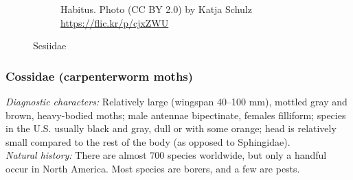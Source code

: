 \documentclass[letterpaper, 11pt]{article}
\begin{document}
\begin{figure}[ht!]
\begin{subfigure}[ht!]{0.40\textwidth}
        \caption{Habitus. Photo (CC BY 2.0) by Katja Schulz \url{https://flic.kr/p/cjxZWU}}
        \label{fig:sesiid2}
    \end{subfigure}
    \caption{Sesiidae}\label{fig:sesiids}
\end{figure}

\subsubsection{Cossidae (carpenterworm moths)}
\noindent{}\textit{Diagnostic characters:} Relatively large (wingspan 40--100 mm), mottled gray and brown, heavy-bodied moths; male antennae bipectinate, females filliform; species in the U.S. usually black and gray, dull or with some orange; head is relatively small compared to the rest of the body (as opposed to Sphingidae).\\

\noindent{}\textit{Natural history:} There are almost 700 species worldwide, but only a handful occur in North America. Most species are borers, and a few are pests.
\end{document}
